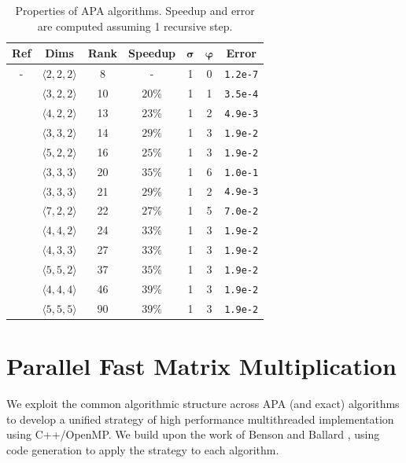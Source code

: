 \documentclass[manuscript]{acmart}
\newcommand{\num}[1]{\texttt{#1}}
\newcommand{\dims}[1]{\langle #1 \rangle}
\begin{document}
\begin{table}
\centering
\begin{tabular}{| c | c c c | c c c |} 
\hline
\textbf{Ref} & \textbf{Dims} & \textbf{Rank} & \textbf{Speedup} & $\mathbf{\sigma}$ & $\mathbf{\varphi}$ & \textbf{Error} \\
\hline
- & $\dims{2,2,2}$ & 8 & - & 1 & 0 & \num{1.2e-7} \\
\hline
\cite{BCRL79} & $\dims{3,2,2}$ & 10 & $20\%$ & 1 & 1 & \num{3.5e-4} \\
\cite{AS13} & $\dims{4,2,2}$ & 13 & $23\%$ & 1 & 2 & \num{4.9e-3} \\
\cite{Smirnov13} & $\dims{3,3,2}$ & 14 & $29\%$ & 1 & 3 & \num{1.9e-2} \\
\cite{Smirnov13} & $\dims{5,2,2}$ & 16 & $25\%$ & 1 & 3 & \num{1.9e-2} \\
\cite{Smirnov13} & $\dims{3,3,3}$ & 20 & $35\%$ & 1 & 6 & \num{1.0e-1} \\
\cite{Schonhage81} & $\dims{3,3,3}$ & 21 & $29\%$ & 1 & 2 & \num{4.9e-3} \\
\cite{Smirnov15} & $\dims{7,2,2}$ & 22 & $27\%$ & 1 & 5 & \num{7.0e-2} \\
\cite{Smirnov16b} & $\dims{4,4,2}$ & 24 & $33\%$ & 1 & 3 & \num{1.9e-2} \\
\cite{Smirnov16a} & $\dims{4,3,3}$ & 27 & $33\%$ & 1 & 3 & \num{1.9e-2} \\
\cite{Smirnov16b} & $\dims{5,5,2}$ & 37 & $35\%$ & 1 & 3 & \num{1.9e-2} \\
\cite{Smirnov14} & $\dims{4,4,4}$ & 46 & $39\%$ & 1 & 3 & \num{1.9e-2} \\
\cite{Smirnov18} & $\dims{5,5,5}$ & 90 & $39\%$ & 1 & 3 & \num{1.9e-2} \\
\hline
\end{tabular}
\caption{Properties of APA algorithms. Speedup and error are computed assuming 1 recursive step.}
\label{tab:algs}
\end{table}

\section{Parallel Fast Matrix Multiplication}

We exploit the common algorithmic structure across APA (and exact) algorithms to develop a unified strategy of high performance multithreaded implementation using C++/OpenMP.
We build upon the work of Benson and Ballard \cite{BB15}, using code generation to apply the strategy to each algorithm.
\end{document}
